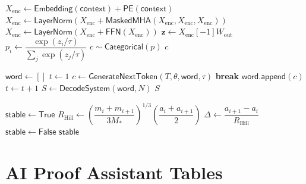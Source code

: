 \documentclass{amsart}
\theoremstyle{break}
\begin{document}
	\begin{algorithmic}[1]
		
		 
		\State $X_{\text{enc}} \gets \mathsf{Embedding}(\mathsf{context}) + \mathsf{PE}(\mathsf{context})$
		\State $X_{\text{enc}} \gets \mathsf{LayerNorm}(X_{\text{enc}} + \mathsf{MaskedMHA}(X_{\text{enc}}, X_{\text{enc}}, X_{\text{enc}}))$
		\State $X_{\text{enc}} \gets \mathsf{LayerNorm}(X_{\text{enc}} + \mathsf{FFN}(X_{\text{enc}}))$
		\EndFor
		\State $\mathbf{z} \gets X_{\text{enc}}[-1] W_{\text{out}}$ 
		\State $p_i \gets \dfrac{\exp(z_i / \tau)}{\sum_j \exp(z_j / \tau)}$ 
		\State $c \sim \mathsf{Categorical}(p)$
		\State \Return $c$
		\EndProcedure
		
		\Statex
		
		 
		\State $\mathsf{word} \gets []$
		\State $t \gets 1$
		\State $c \gets \mathsf{GenerateNextToken}(T, \theta, \mathsf{word}, \tau)$
		 
		\State \textbf{break}
		\EndIf
		\State $\mathsf{word}.\mathsf{append}(c)$
		\State $t \gets t + 1$
		\EndWhile
		\State $S \gets \mathsf{DecodeSystem}(\mathsf{word}, N)$
		\State \Return $S$
		\EndProcedure
		
		\Statex
		
		 
		\State $\mathsf{stable} \gets \mathsf{True}$
		\State $R_{\mathrm{Hill}} \gets \left(\dfrac{m_i + m_{i+1}}{3M_*}\right)^{1/3} \left(\dfrac{a_i + a_{i+1}}{2}\right)$ 
		\State $\Delta \gets \dfrac{a_{i+1} - a_i}{R_{\mathrm{Hill}}}$
		 
		\State $\mathsf{stable} \gets \mathsf{False}$ 
		\EndIf
		\EndFor
		\State \Return $\mathsf{stable}$
		\EndProcedure
		
	\end{algorithmic}
	\vspace{20pt}
	\section{AI Proof Assistant Tables}
	\label{sec:proof-tables}
	\vspace{20pt}
	\fontsize{9}{15}\selectfont
	
\end{document}
